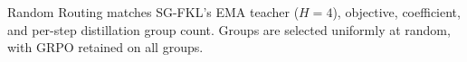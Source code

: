 Random Routing matches SG-FKL's EMA teacher ($H=4$), objective, coefficient, and per-step distillation group count. Groups are selected uniformly at random, with GRPO retained on all groups.
